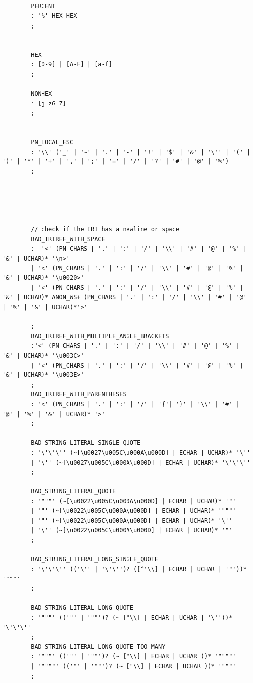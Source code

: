 \begin{appendices}
\begin{lstlisting}
		
		PERCENT
		: '%' HEX HEX
		;
		
		
		HEX
		: [0-9] | [A-F] | [a-f]
		;
		
		NONHEX
		: [g-zG-Z]
		;
		
		
		PN_LOCAL_ESC
		: '\\' ('_' | '~' | '.' | '-' | '!' | '$' | '&' | '\'' | '(' | ')' | '*' | '+' | ',' | ';' | '=' | '/' | '?' | '#' | '@' | '%')
		;
		
		
		
		
		
		// check if the IRI has a newline or space  
		BAD_IRIREF_WITH_SPACE
		:  '<' (PN_CHARS | '.' | ':' | '/' | '\\' | '#' | '@' | '%' | '&' | UCHAR)* '\n>'
		| '<' (PN_CHARS | '.' | ':' | '/' | '\\' | '#' | '@' | '%' | '&' | UCHAR)* '\u0020>'
		| '<' (PN_CHARS | '.' | ':' | '/' | '\\' | '#' | '@' | '%' | '&' | UCHAR)* ANON_WS+ (PN_CHARS | '.' | ':' | '/' | '\\' | '#' | '@' | '%' | '&' | UCHAR)*'>'
		
		;
		BAD_IRIREF_WITH_MULTIPLE_ANGLE_BRACKETS
		:'<' (PN_CHARS | '.' | ':' | '/' | '\\' | '#' | '@' | '%' | '&' | UCHAR)* '\u003C>'
		| '<' (PN_CHARS | '.' | ':' | '/' | '\\' | '#' | '@' | '%' | '&' | UCHAR)* '\u003E>'
		;
		BAD_IRIREF_WITH_PARENTHESES 
		: '<' (PN_CHARS | '.' | ':' | '/' | '{'| '}' | '\\' | '#' | '@' | '%' | '&' | UCHAR)* '>'
		;
		
		BAD_STRING_LITERAL_SINGLE_QUOTE   
		: '\'\'\'' (~[\u0027\u005C\u000A\u000D] | ECHAR | UCHAR)* '\'' 
		| '\'' (~[\u0027\u005C\u000A\u000D] | ECHAR | UCHAR)* '\'\'\'' 
		;
		
		BAD_STRING_LITERAL_QUOTE      
		: '"""' (~[\u0022\u005C\u000A\u000D] | ECHAR | UCHAR)* '"' 
		| '"' (~[\u0022\u005C\u000A\u000D] | ECHAR | UCHAR)* '"""' 
		| '"' (~[\u0022\u005C\u000A\u000D] | ECHAR | UCHAR)* '\'' 
		| '\'' (~[\u0022\u005C\u000A\u000D] | ECHAR | UCHAR)* '"' 			
		;  	  
		
		BAD_STRING_LITERAL_LONG_SINGLE_QUOTE
		: '\'\'\'' (('\'' | '\'\'')? ([^'\\] | ECHAR | UCHAR | '"'))* '"""'
		;
		
		BAD_STRING_LITERAL_LONG_QUOTE
		: '"""' (('"' | '""')? (~ ["\\] | ECHAR | UCHAR | '\''))* '\'\'\''
		;
		BAD_STRING_LITERAL_LONG_QUOTE_TOO_MANY
		: '"""' (('"' | '""')? (~ ["\\] | ECHAR | UCHAR ))* '""""'
		| '""""' (('"' | '""')? (~ ["\\] | ECHAR | UCHAR ))* '"""'
		;	
		

\end{lstlisting}
\end{appendices}
